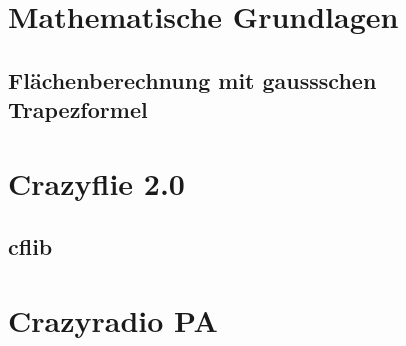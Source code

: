 \section{Mathematische Grundlagen}
\blindtext

\subsection{Flächenberechnung mit gaussschen Trapezformel}
\blindtext

\section{Crazyflie 2.0}
\blindtext

\subsection{cflib}
\blindtext

\section{Crazyradio PA}
\blindtext

\endgroup